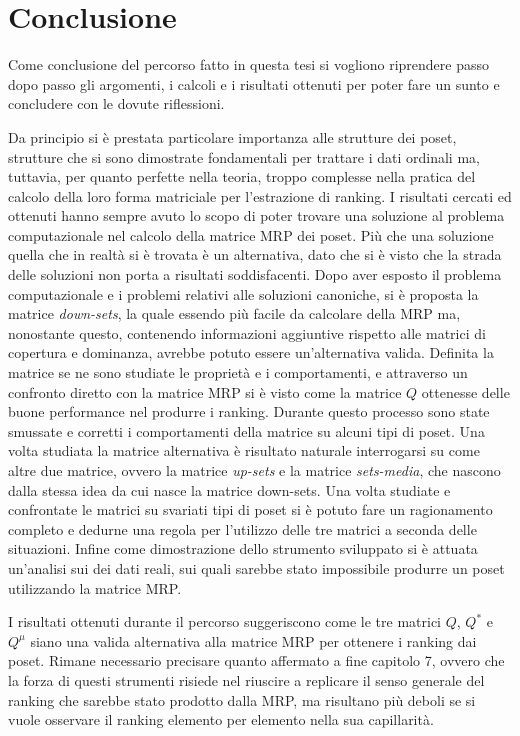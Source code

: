 \documentclass{report}
\begin{document}
\chapter{Conclusione}
Come conclusione del percorso fatto in questa tesi si vogliono riprendere passo dopo passo gli argomenti, i calcoli e i risultati ottenuti per poter fare un sunto e concludere con le dovute riflessioni.


Da principio si è prestata particolare importanza alle strutture dei poset, strutture che si sono dimostrate fondamentali per trattare i dati ordinali ma, tuttavia, per quanto perfette nella teoria, troppo complesse nella pratica del calcolo della loro forma matriciale per l'estrazione di ranking.  I risultati cercati ed ottenuti hanno sempre avuto lo scopo di poter trovare una soluzione al problema computazionale nel calcolo della matrice MRP dei poset. Più che una soluzione quella che in realtà si è trovata è un alternativa, dato che si è visto che la strada delle soluzioni non porta a risultati soddisfacenti. Dopo aver esposto il problema computazionale e i problemi relativi alle soluzioni canoniche, si è proposta la matrice \textit{down-sets}, la quale essendo più facile da calcolare della MRP ma, nonostante questo, contenendo informazioni aggiuntive rispetto alle matrici di copertura e dominanza, avrebbe potuto essere un'alternativa valida. Definita la matrice se ne sono studiate le proprietà e i comportamenti, e attraverso un confronto diretto con la matrice MRP si è visto come la matrice $Q$ ottenesse delle buone performance nel produrre i ranking. Durante questo processo sono state smussate e corretti i comportamenti della matrice su alcuni tipi di poset. Una volta studiata la matrice alternativa è risultato naturale interrogarsi su come altre due matrice, ovvero la matrice \textit{up-sets} e la matrice \textit{sets-media}, che nascono dalla stessa idea da cui nasce la matrice down-sets. Una volta studiate e confrontate le matrici su svariati tipi di poset si è potuto fare un ragionamento completo e dedurne una regola per l'utilizzo delle tre matrici a seconda delle situazioni. Infine come dimostrazione dello strumento sviluppato si è attuata un'analisi sui dei dati reali, sui quali sarebbe stato impossibile produrre un poset utilizzando la matrice MRP.


I risultati ottenuti durante il percorso suggeriscono come le tre matrici $Q$, $Q^{*}$ e $Q^{\mu}$ siano una valida alternativa alla matrice MRP per ottenere i ranking dai poset. Rimane necessario precisare quanto affermato a fine capitolo 7, ovvero che la forza di questi strumenti risiede nel riuscire a replicare il senso generale del ranking che sarebbe stato prodotto dalla MRP, ma risultano più deboli se si vuole osservare il ranking elemento per elemento nella sua capillarità. 
\end{document}
